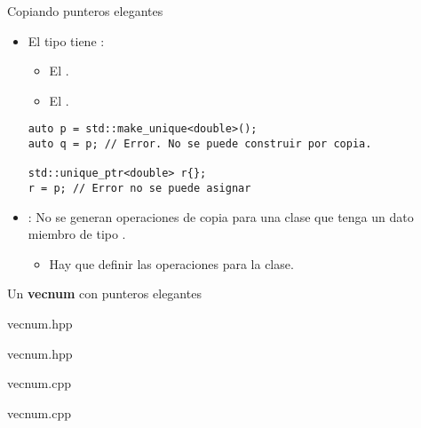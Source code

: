 \begin{frame}[t,fragile]{Copiando punteros elegantes}
\begin{itemize}
  \item El tipo  tiene :
    \begin{itemize}
      \item El .
      \item El .
    \end{itemize}
\begin{lstlisting}
auto p = std::make_unique<double>();
auto q = p; // Error. No se puede construir por copia.

std::unique_ptr<double> r{};
r = p; // Error no se puede asignar
\end{lstlisting}

  \item {}: No se generan operaciones de copia para una clase
        que tenga un dato miembro de tipo .
    \begin{itemize}
      \item Hay que definir las operaciones para la clase.
    \end{itemize}
\end{itemize}
\end{frame}

\begin{frame}[t]{Un \textbf{vecnum} con punteros elegantes}
\begin{block}{vecnum.hpp}

\end{block}
\end{frame}

\begin{frame}[t]
\begin{block}{vecnum.hpp}

\end{block}
\end{frame}

\begin{frame}[t]
\begin{block}{vecnum.cpp}

\end{block}
\end{frame}

\begin{frame}[t]
\begin{block}{vecnum.cpp}

\end{block}
\end{frame}
